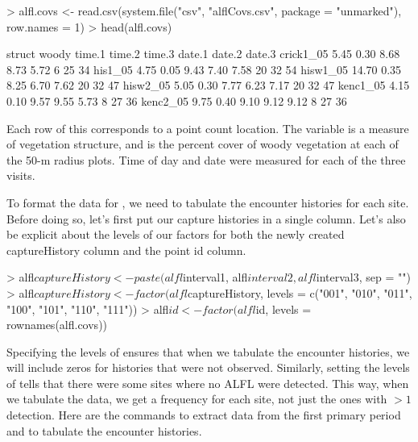 \documentclass[a4paper]{article}
\renewenvironment{Schunk}{\vspace{\topsep}}{\vspace{\topsep}}
\begin{document}
\begin{Schunk}
\begin{Sinput}
> alfl.covs <- read.csv(system.file("csv", "alflCovs.csv", 
     package = "unmarked"), row.names = 1)
> head(alfl.covs)
\end{Sinput}
\begin{Soutput}
          struct woody time.1 time.2 time.3 date.1 date.2 date.3
crick1_05   5.45  0.30   8.68   8.73   5.72      6     25     34
his1_05     4.75  0.05   9.43   7.40   7.58     20     32     54
hisw1_05   14.70  0.35   8.25   6.70   7.62     20     32     47
hisw2_05    5.05  0.30   7.77   6.23   7.17     20     32     47
kenc1_05    4.15  0.10   9.57   9.55   5.73      8     27     36
kenc2_05    9.75  0.40   9.10   9.12   9.12      8     27     36
\end{Soutput}
\end{Schunk}

Each row of this  corresponds to a point count
location. The variable  is a measure of vegetation
structure, and  is the percent cover of woody vegetation
at each of the 50-m radius plots. Time of day and date were measured
for each of the three visits.

To format the data for , we need to tabulate the
encounter histories for each site. Before doing so, let's first put
our capture histories in a single column. Let's also be explicit about
the levels of our factors for both the newly created captureHistory
column and the point id column.

\begin{Schunk}
\begin{Sinput}
> alfl$captureHistory <- paste(alfl$interval1, alfl$interval2, 
     alfl$interval3, sep = "")
> alfl$captureHistory <- factor(alfl$captureHistory, levels = c("001", 
     "010", "011", "100", "101", "110", "111"))
> alfl$id <- factor(alfl$id, levels = rownames(alfl.covs))
\end{Sinput}
\end{Schunk}
Specifying the levels of  ensures that when we
tabulate the encounter histories, we will include zeros for histories
that were not observed. Similarly, setting the levels of
 tells  that there
were some sites where no ALFL were detected. This way, when we
tabulate the data, we get a frequency for each site, not just the ones
with $>1$ detection. Here are the commands to extract data from the
first primary period and to tabulate the encounter
histories.
\end{document}
